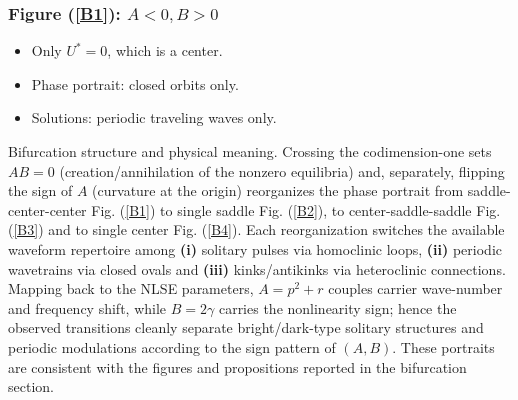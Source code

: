 \documentclass{article}
\numberwithin{equation}{section}
\begin{document}
\subsubsection*{Figure (\ref{B1}): $A<0, B>0$}
\begin{itemize}
    \item Only $U^\ast = 0$, which is a center.
    \item Phase portrait: closed orbits only.
    \item Solutions: periodic traveling waves only.
\end{itemize}
Bifurcation structure and physical meaning. Crossing the codimension-one sets $AB=0$ (creation/annihilation of the nonzero equilibria) and, separately, flipping the sign of
$A$ (curvature at the origin) reorganizes the phase portrait from saddle-center-center Fig. (\ref{B1}) to single saddle Fig. (\ref{B2}), to center-saddle-saddle Fig. (\ref{B3}) and to single center Fig. (\ref{B4}). Each reorganization switches the available waveform repertoire among \textbf{(i)} solitary pulses via homoclinic loops, \textbf{(ii)} periodic wavetrains via closed ovals and \textbf{(iii)} kinks/antikinks via heteroclinic connections. Mapping back to the NLSE parameters, $A=p^2+r$ couples carrier wave-number and frequency shift, while $B=2\gamma$ carries the nonlinearity sign; hence the observed transitions cleanly separate bright/dark-type solitary structures and periodic modulations according to the sign pattern of $(A,B)$. These portraits are consistent with the figures and propositions reported in the bifurcation section.
\end{document}
